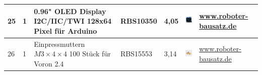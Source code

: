 \begin{center}
\begin{tabularx}{\textwidth}{|p{0.4cm}|p{0.4cm}|X|X|p{1cm}|X|X|}
		\hline
		25 & 1 & 0.96" OLED Display I2C/IIC/TWI 128x64 Pixel für Arduino & RBS10350 & 4,05 & \includegraphics[width=2cm]{Images/Material/oled96.jpg} & \href{https://www.roboter-bausatz.de/p/0.96-oled-display-i2c-iic-twi-128x64-pixel-fuer-arduino}{www.roboter-bausatz.de} \\
		\hline
		26 & 1 & Einpressmuttern $M3\times 4 \times 4$ 100 Stück für Voron 2.4 & RBS15553 & 3,14 & \includegraphics[width=2cm]{Images/Material/RBS15553.jpg} & \href{https://www.roboter-bausatz.de/p/einpressmuttern-m3x4x4-100-stueck-fuer-voron-2.4}{www.roboter-bausatz.de} \\
		\hline
	\end{tabularx}
	
\end{center}